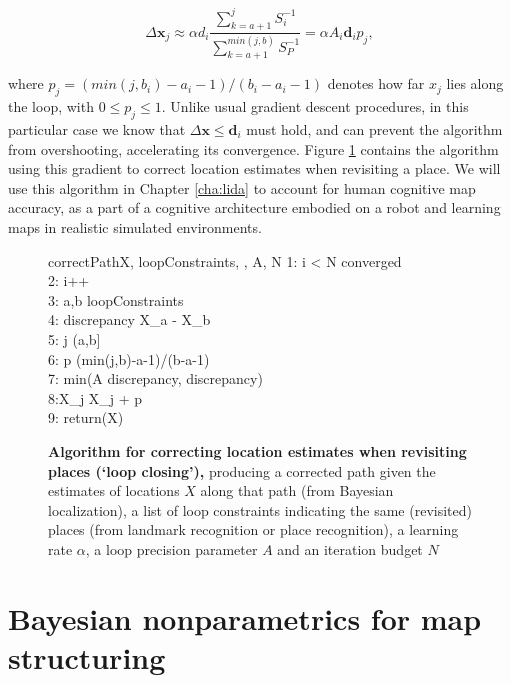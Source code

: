 \begin{equation}
\label{correction}
\Delta \bm x_j \approx \alpha d_i \frac{\sum_{k=a+1}^{j} S_i^{-1}}{\sum_{k=a+1}^{min(j,b)} S_P^{-1}} = \alpha A_i \bm d_i p_j,
\end{equation}

where $p_j=(min(j,b_i)-a_i-1)/(b_i-a_i-1)$ denotes how far $x_j$ lies along the loop, with $0 \leq p_j \leq 1$. Unlike usual gradient descent procedures, in this particular case we know that $\Delta \bm x \leq \bm d_i $ must hold, and can prevent the algorithm from overshooting, accelerating its convergence. Figure \ref{fig:sgdslam} contains the algorithm using this gradient to correct location estimates when revisiting a place. We will use this algorithm in Chapter \ref{cha:lida} to account for human cognitive map accuracy, as a part of a cognitive architecture embodied on a robot and learning maps in realistic simulated environments.

\begin{figure}[h]
	\begin{pseudocode}{correctPath}{X, loopConstraints, \alpha, A, N}
		1: \WHILE i < N \AND \NOT converged \\
		2: \quad i++ \\
		3: \quad \FOREACH a,b \in loopConstraints \\
		4: \quad \quad discrepancy \GETS X_a - X_b \\
		5: \quad \quad \FOREACH j \in (a,b] \\
		6: \quad \quad \quad p \GETS (min(j,b)-a-1)/(b-a-1) \\
		7: \quad \quad \quad \beta \GETS min(\alpha A \cdot discrepancy, discrepancy) \\
		8:\quad\quad\quad X_j \GETS X_j + \beta p \\
		9: return(X)
	\end{pseudocode}
	\caption[Algorithm for correcting location estimates when revisiting places]{\textbf{Algorithm for correcting location estimates when revisiting places (`loop closing'),} producing a corrected path given the estimates of locations $X$ along that path (from Bayesian localization), a list of loop constraints indicating the same (revisited) places (from landmark recognition or place recognition), a learning rate $\alpha$, a loop precision parameter $A$ and an iteration budget $N$}
	\label{fig:sgdslam}
\end{figure}

\section{Bayesian nonparametrics for map structuring}
\label{sec:bayesmap}


